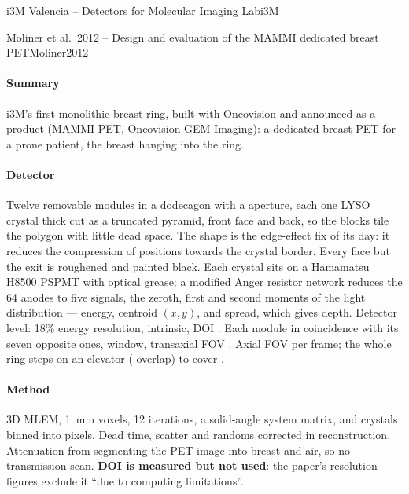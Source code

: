 \begin{programnote}{i3M Valencia -- Detectors for Molecular Imaging Lab}{i3M}
\begin{papernote}{Moliner et al.\ 2012 -- Design and evaluation of the MAMMI dedicated breast PET}{Moliner2012}
\paragraph{Summary}
i3M's first monolithic breast ring, built with Oncovision and announced as a
product (MAMMI PET, Oncovision GEM-Imaging): a dedicated breast PET for a
prone patient, the breast hanging into the ring.

\paragraph{Detector}
Twelve removable modules in a dodecagon with a  aperture, each one
LYSO crystal  thick cut as a truncated pyramid, 
front face and  back, so the blocks tile the polygon
with little dead space. The shape is the edge-effect fix of its day: it
reduces the compression of positions towards the crystal border. Every face
but the exit is roughened and painted black. Each crystal sits on a
Hamamatsu H8500 PSPMT with optical grease; a modified Anger resistor network
reduces the 64 anodes to five signals, the zeroth, first and second moments
of the light distribution --- energy, centroid $(x,y)$, and spread, which
gives depth. Detector level: 18\% energy resolution,  intrinsic, DOI
. Each module in coincidence with its seven opposite ones, 
window, transaxial FOV . Axial FOV  per frame; the whole ring
steps  on an elevator ( overlap) to cover .

\paragraph{Method}
3D MLEM, \qty{1}{\mm} voxels, 12 iterations, a solid-angle system matrix, and
crystals binned into  pixels. Dead time, scatter and
randoms corrected in reconstruction. Attenuation from segmenting the PET
image into breast and air, so no transmission scan. \textbf{DOI is measured
but not used}: the paper's resolution figures exclude it ``due to computing
limitations''.


\end{papernote}
\end{programnote}
